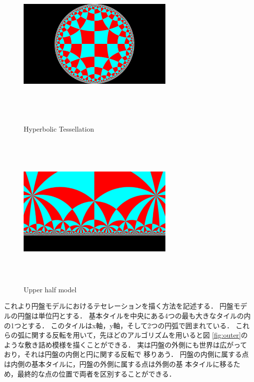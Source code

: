 \begin{figure}[h!tbp]
 \begin{minipage}{0.49\hsize}
  \center
  \includegraphics[width=3in, height=3in,
  keepaspectratio]{../img/tessellation/hyperbolicTessellation.pdf}
  \caption{Hyperbolic Tessellation}
  \label{fig:hyperbolicTessellation}
 \end{minipage}
 \hspace*{\fill}
 \begin{minipage}{0.49\hsize}
  \center
  \includegraphics[width=3in, height=3in, keepaspectratio]{../img/tessellation/upperHalf.pdf}
  \caption{Upper half model}
  \label{fig:upperHalf}
 \end{minipage}
\end{figure}

これより円盤モデルにおけるテセレーションを描く方法を記述する．
円盤モデルの円盤は単位円とする．
基本タイルを中央にある4つの最も大きなタイルの内の1つとする．
このタイルはx軸，y軸，そして2つの円弧で囲まれている．
これらの弧に関する反転を用いて，先ほどのアルゴリズムを用いると図
\ref{fig:outer}のような敷き詰め模様を描くことができる．
実は円盤の外側にも世界は広がっており，それは円盤の内側と円に関する反転で
移りあう．
円盤の内側に属する点は内側の基本タイルに，円盤の外側に属する点は外側の基
本タイルに移るため，最終的な点の位置で両者を区別することができる．

